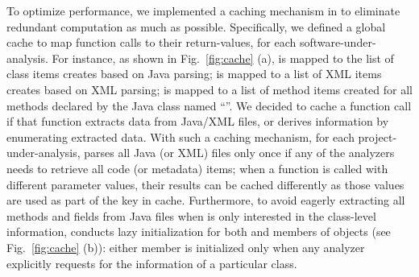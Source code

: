 To optimize performance, we implemented a caching mechanism in \tool to eliminate redundant computation as much as possible. Specifically, we defined a global cache to map function calls to their return-values, for each software-under-analysis. For instance, as shown in Fig.~\ref{fig:cache} (a),  is mapped to the list of class items \tool creates based on Java parsing;  is mapped to a list of XML items \tool creates based on XML parsing;  is mapped to a list of method items created for all methods declared by the Java class named ``''. 
We decided to cache a function call if that function extracts data from Java/XML files, or derives information by enumerating extracted data. With such a caching mechanism, for each project-under-analysis, \tool parses all Java (or XML) files only once if any of the analyzers needs to retrieve all code (or metadata) items; when a function is called with different parameter values, their results can be cached differently as those values are used as part of the key in cache.
Furthermore, to avoid eagerly extracting all methods and fields from Java files when \tool is only interested in the class-level information, \tool conducts lazy initialization for both  and  members of  objects (see Fig.~\ref{fig:cache} (b)): 
either member is initialized only when any analyzer explicitly requests for the information of a particular class.

